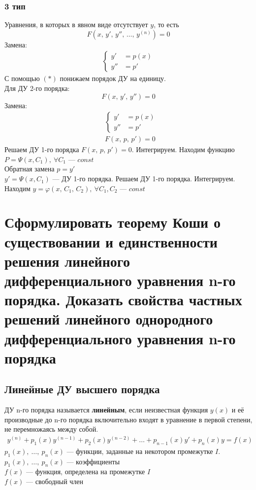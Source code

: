 \subsubsection*{3 тип}
Уравнения, в которых в явном виде отсутствует $y$, то есть
\[
    \boxed{F\left(x,\, y',\, y'',\, \ldots,\, y^{(n)}\right) = 0}
\]
Замена: 
\begin{align*}
    \left\{ \begin{aligned}
        y' &= p(x) \\
        y'' &= p'
    \end{aligned} \right. \tag{$*$}
\end{align*}
С помощью $(*)$ понижаем порядок ДУ на единицу. \\ 
Для ДУ 2-го порядка:
\[
    F(x,\, y',\, y'') = 0
\]
Замена:
\begin{align*}
    & \left\{ \begin{aligned}
        y' &= p(x) \\
        y'' &= p'
    \end{aligned} \right. \tag{$*$} \\
    & F(x,\, p,\, p') = 0
\end{align*}
 Решаем ДУ 1-го порядка $F(x,\, p,\, p') = 0$. Интегрируем. Находим функцию\break$P = \Psi (x, C_1),\ \forall C_1$ --- $const$ \\[1ex]
 Обратная замена $p = y'$ \\[1ex]
 $y' = \Psi (x, C_1)$ --- ДУ 1-го порядка. Решаем ДУ 1-го порядка. Интегрируем. Находим $y = \varphi (x,\, C_1,\, C_2),\ \forall C_1, C_2$ --- $const$

\newpage
\section{Сформулировать теорему Коши о существовании и единственности решения линейного дифференциального уравнения n-го порядка. Доказать свойства частных решений линейного однородного дифференциального уравнения n-го порядка}
\setcounter{equation}{0}
\subsection*{Линейные ДУ высшего порядка}
\begin{definition}
    ДУ n-го порядка называется \textbf{линейным}, если неизвестная функция $y(x)$ и её производные до n-го порядка включительно входят в уравнение в первой степени, не перемножаясь между собой.
    \begin{gather}
        \boxed{y^{(n)} + p_1(x)y^{(n-1)}  + p_2(x)y^{(n-2)} + \ldots + p_{n-1}(x)y' + p_n(x)y = f(x)}
    \end{gather}
    $p_1(x),\ \ldots,\ p_n (x)$ --- функции, заданные на некотором промежутке $I$.\\
    $p_1(x),\ \ldots,\ p_n (x)$ --- коэффициенты \\
    $f(x)$ --- функция, определена на промежутке $I$ \\
    $f(x)$ --- свободный член
\end{definition}

